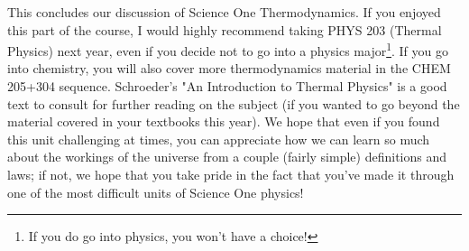 This concludes our discussion of Science One Thermodynamics. If you enjoyed this part of the course, I would highly recommend taking PHYS 203 (Thermal Physics) next year, even if you decide not to go into a physics major\footnote{If you do go into physics, you won't have a choice!}. If you go into chemistry, you will also cover more thermodynamics material in the CHEM 205+304 sequence. Schroeder's "An Introduction to Thermal Physics" is a good text to consult for further reading on the subject (if you wanted to go beyond the material covered in your textbooks this year). We hope that even if you found this unit challenging at times, you can appreciate how we can learn so much about the workings of the universe from a couple (fairly simple) definitions and laws; if not, we hope that you take pride in the fact that you've made it through one of the most difficult units of Science One physics!

